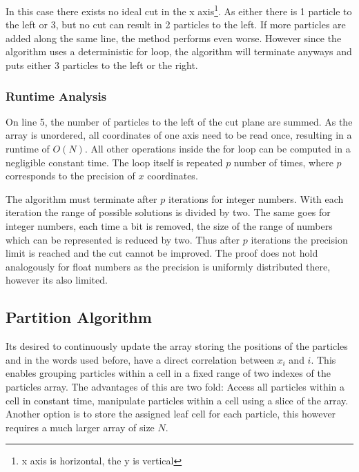 \documentclass[]{article}
\begin{document}
\begin{figure}[H]
	\begin{center}
	\end{center}
\end{figure}

In this case there exists no ideal cut in the x axis\footnote{x axis is horizontal, the y is vertical}. As either there is 1 particle to the left or 3, but no cut can result in 2 particles to the left. If more particles are added along the same line, the method performs even worse. However since the algorithm uses a deterministic for loop, the algorithm will terminate anyways and puts either 3 particles to the left or the right.

\subsubsection{Runtime Analysis}

On line 5, the number of particles to the left of the cut plane are summed. As the array is unordered, all coordinates of one axis need to be read once, resulting in a runtime of $O(N)$. All other operations inside the for loop can be computed in a negligible constant time. The loop itself is repeated $p$ number of times, where $p$ corresponds to the precision of $x$ coordinates.

The algorithm must terminate after $p$ iterations for integer numbers. With each iteration the range of possible solutions is divided by two. The same goes for integer numbers, each time a bit is removed, the size of the range of numbers which can be represented is reduced by two. Thus after $p$ iterations the precision limit is reached and the cut cannot be improved. The proof does not hold analogously for float numbers as the precision is uniformly distributed there, however its also limited. 

\subsection{Partition Algorithm}\label{sec:part}

Its desired to continuously update the array storing the positions of the particles and in the words used before, have a direct correlation between $x_i$ and $i$. This enables grouping particles within a cell in a fixed range of two indexes of the particles array. The advantages of this are two fold: Access all particles within a cell in constant time, manipulate particles within a cell using a slice of the array. 
Another option is to store the assigned leaf cell for each particle, this however requires a much larger array of size $N$. 
\end{document}
